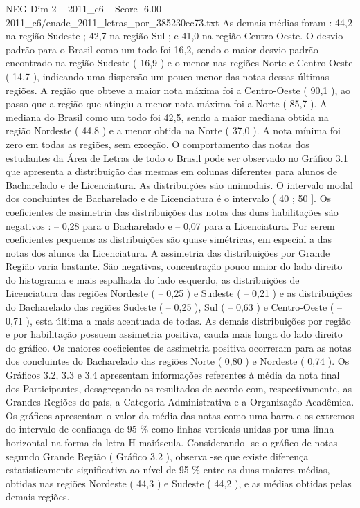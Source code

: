 \begin{textsample}{NEG Dim 2 – 2011\_c6 – Score -6.00 – 2011\_c6/enade\_2011\_letras\_por\_385230ec73.txt}
As demais médias foram : 44,2 na região Sudeste ; 42,7 na região Sul ; e 41,0 na região Centro-Oeste.
O desvio padrão para o Brasil como um todo foi 16,2, sendo o maior desvio padrão encontrado na região Sudeste ( 16,9 ) e o menor nas regiões Norte e Centro-Oeste ( 14,7 ), indicando uma dispersão um pouco menor das notas dessas últimas regiões.
A região que obteve a maior nota máxima foi a Centro-Oeste ( 90,1 ), ao passo que a região que atingiu a menor nota máxima foi a Norte ( 85,7 ).
A mediana do Brasil como um todo foi 42,5, sendo a maior mediana obtida na região Nordeste ( 44,8 ) e a menor obtida na Norte ( 37,0 ).
A nota mínima foi zero em todas as regiões, sem exceção.
O comportamento das notas dos estudantes da Área de Letras de todo o Brasil pode ser observado no Gráfico 3.1 que apresenta a distribuição das mesmas em colunas diferentes para alunos de Bacharelado e de Licenciatura.
As distribuições são unimodais.
O intervalo modal dos concluintes de Bacharelado e de Licenciatura é o intervalo ( 40 ; 50 ].
Os coeficientes de assimetria das distribuições das notas das duas habilitações são negativos : – 0,28 para o Bacharelado e – 0,07 para a Licenciatura.
Por serem coeficientes pequenos as distribuições são quase simétricas, em especial a das notas dos alunos da Licenciatura.
A assimetria das distribuições por Grande Região varia bastante.
São negativas, concentração pouco maior do lado direito do histograma e mais espalhada do lado esquerdo, as distribuições de Licenciatura das regiões Nordeste ( – 0,25 ) e Sudeste ( – 0,21 ) e as distribuições do Bacharelado das regiões Sudeste ( – 0,25 ), Sul ( – 0,63 ) e Centro-Oeste ( – 0,71 ), esta última a mais acentuada de todas.
As demais distribuições por região e por habilitação possuem assimetria positiva, cauda mais longa do lado direito do gráfico.
Os maiores coeficientes de assimetria positiva ocorreram para as notas dos concluintes do Bacharelado das regiões Norte ( 0,80 ) e Nordeste ( 0,74 ).
Os Gráficos 3.2, 3.3 e 3.4 apresentam informações referentes à média da nota final dos Participantes, desagregando os resultados de acordo com, respectivamente, as Grandes Regiões do país, a Categoria Administrativa e a Organização Acadêmica.
Os gráficos apresentam o valor da média das notas como uma barra e os extremos do intervalo de confiança de 95 \% como linhas verticais unidas por uma linha horizontal na forma da letra H maiúscula.
Considerando -se o gráfico de notas segundo Grande Região ( Gráfico 3.2 ), observa -se que existe diferença estatisticamente significativa ao nível de 95 \% entre as duas maiores médias, obtidas nas regiões Nordeste ( 44,3 ) e Sudeste ( 44,2 ), e as médias obtidas pelas demais regiões.

\end{textsample}
